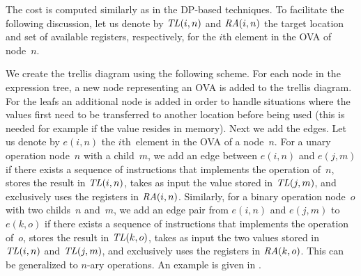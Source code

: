 %
The cost is computed similarly as in the \gls{DP}-based techniques.
%
To facilitate the following discussion, let us denote by \mbox{$\mathit{TL}(i, n)$} and
\mbox{$\mathit{RA}(i, n)$} the target location and set of available \glspl{register},
respectively, for the $i$th element in the \gls{OVA} of node~$n$.

We create the \gls{trellis diagram} using the following scheme.
%
For each \gls{node} in the \gls{expression tree}, a new \gls{node} representing
an \gls{OVA} is added to the \gls{trellis diagram}.
%
For the \glspl{leaf} an additional \gls{node} is added in order to handle
situations where the values first need to be transferred to another location
before being used (this is needed for example if the value resides in memory).
%
Next we add the \glspl{edge}.
%
Let us denote by \mbox{$e(i, n)$} the $i$th~element in the \gls{OVA} of a
\gls{node}~$n$.
%
For a unary operation \gls{node}~$n$ with a \gls{child}~$m$, we add an
\gls{edge} between \mbox{$e(i, n)$} and \mbox{$e(j, m)$} if there exists a
sequence of \glspl{instruction} that implements the operation of~$n$, stores the
result in \mbox{$\mathit{TL}(i, n)$}, takes as input the value stored in \mbox{$\mathit{TL}(j,
  m)$}, and exclusively uses the \glspl{register} in \mbox{$\mathit{RA}(i, n)$}.
%
Similarly, for a binary operation \gls{node}~$o$ with two \glspl{child}~$n$
and~$m$, we add an \gls{edge} pair from \mbox{$e(i, n)$} and \mbox{$e(j, m)$} to
\mbox{$e(k, o)$} if there exists a sequence of \glspl{instruction} that
implements the operation of~$o$, stores the result in \mbox{$\mathit{TL}(k, o)$}, takes
as input the two values stored in \mbox{$\mathit{TL}(i, n)$} and \mbox{$\mathit{TL}(j, m)$},
and exclusively uses the \glspl{register} in \mbox{$\mathit{RA}(k, o)$}.
%
This can be generalized to \mbox{$n$-ary} operations.
%
An example is given in .


